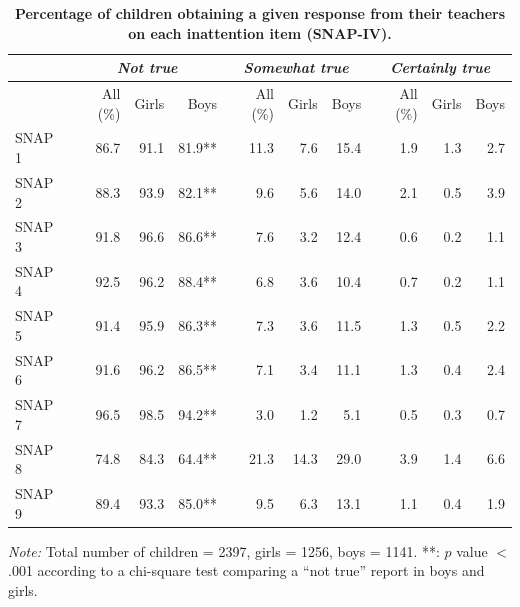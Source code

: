\documentclass[10pt,letterpaper]{article}
\begin{document}
\vspace{5mm}

\begin{table}[!ht]
\begin{adjustwidth}{-5mm}{0in} %
\centering
\caption{ \bf Percentage of children obtaining a given response from their teachers on each inattention item (SNAP-IV).} 
\vspace{5mm}
\begin{tabular}{|lrrr|rrr|rrr|}
\hline
                & \multicolumn{3}{c|}{\emph{Not true}}  &  \multicolumn{3}{c}{\emph{Somewhat true}}\ &  \multicolumn{3}{|c|}{\emph{Certainly true}}\\ \hline
                    & All  (\%) & Girls & Boys  & All (\%)  & Girls & Boys & All  (\%) & Girls & Boys\\  \hline
SNAP 1  & 86.7 & 91.1 & 81.9**  & 11.3 & 7.6   & 15.4  & 1.9 & 1.3 & 2.7\\  \hline
SNAP 2  &88.3 & 93.9   & 82.1** & 9.6 & 5.6 & 14.0 & 2.1 & 0.5 & 3.9\\  \hline
SNAP 3  & 91.8  &  96.6 &  86.6** & 7.6 & 3.2 & 12.4 & 0.6 & 0.2 & 1.1 \\   \hline
SNAP 4  & 92.5  & 96.2   & 88.4**  & 6.8 & 3.6 & 10.4 & 0.7& 0.2 & 1.1 \\   \hline
SNAP 5  &  91.4 & 95.9 & 86.3**  & 7.3 & 3.6  & 11.5  &1.3 & 0.5 & 2.2  \\   \hline
SNAP 6  & 91.6 & 96.2 & 86.5**  & 7.1 & 3.4 & 11.1 & 1.3 & 0.4 & 2.4 \\   \hline
SNAP 7  & 96.5 & 98.5   & 94.2**   & 3.0  & 1.2 & 5.1 & 0.5 & 0.3 & 0.7 \\   \hline
SNAP 8  & 74.8 & 84.3   & 64.4**  & 21.3  & 14.3  & 29.0 &  3.9 & 1.4 & 6.6\\    \hline
SNAP 9  & 89.4 & 93.3 & 85.0** & 9.5 & 6.3 & 13.1 & 1.1 & 0.4  & 1.9 \\  \hline
\end{tabular}
\label{Numerical_SNAP}
\end{adjustwidth}
\textit{Note:} {Total number of children = 2397, girls = 1256, boys = 1141.  **: $p$ value $<$.001 according to a chi-square test comparing a ``not true'' report in boys and girls.} \\ 
\end{table}
\end{document}
